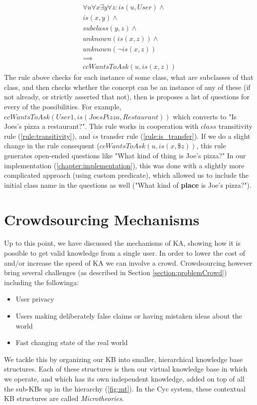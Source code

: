\begin{equation}\label{rule:autoIs}
\begin{gathered}
 \forall u \forall x \exists y \forall z:
 is (u,User) \land \\
 is(x,y) \land \\
 subclass(y,z) \land \\
 unknown (is(x,z)) \land \\
 unknown(\lnot is(x,z)) \\
 \implies\\
 ccWantsToAsk(u,is(x,z))
\end{gathered}
\end{equation}
The rule above checks for each instance of some class, what are subclasses of 
that class, and then checks whether the concept can be an instance of any of 
these (if not already, or strictly asserted that not), then is proposes a
list of questions for every of the possibilities. For example,
$ccWantsToAsk(User1,is(JoesPizza,Restaurant))$ which converts to "Is Joes's 
pizza a restaurant?". This rule works in cooperation with $class$ transitivity
rule (\ref{rule:transitivity}), and $is$ transfer rule (\ref{rule:is_transfer}).
If we do a slight change in the rule consequent ($ccWantsToAsk(u,is(x,\$z))$,
this rule generates open-ended questions like "What kind of thing is Joe's
pizza?" In our implementation (\autoref{chapter:implementation}), this was
done with a slightly more complicated approach (using custom predicate), which
allowed us to include the initial class name in the questions as well 
("What kind of \textbf{place} is Joe's pizza?"). 

\section{Crowdsourcing Mechanisms}
\label{section:crowdsourcing}
Up to this point, we have discussed the mechanisms of KA, showing how it is 
possible to get valid knowledge from a single user. In order to lower the cost 
of and/or increase the speed of KA we can involve a crowd. Crowdsourcing 
however bring several challenges (as described in Section 
\autoref{section:problemCrowd}) including the followinga:
\begin{itemize}
\item User privacy
\item Users making deliberately false claims or having mistaken ideas about the 
world
\item Fast changing state of the real world
\end{itemize}
We tackle this by organizing our KB into smaller, hierarchical knowledge base 
structures. Each of these structures is then our virtual knowledge base in 
which we operate, and which has its own independent knowledge, added on top of 
all the sub-KBs up in the hierarchy (\autoref{fig:mt}). In the Cyc system, these
contextual KB structures are called \emph{Microtheories}\parencite{Kleer2013}.

